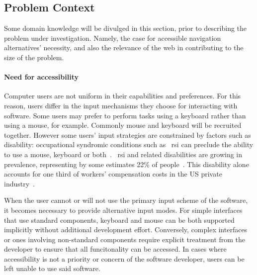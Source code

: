 \documentclass[11pt,openright,a4paper]{report}
\begin{document}
\subsection{Problem Context}
Some domain knowledge will be divulged in this section, prior to describing the problem under investigation. Namely, the case for accessible navigation alternatives' necessity, and also the relevance of the web in contributing to the size of the problem.
\paragraph{Need for accessibility}
Computer users are not uniform in their capabilities and preferences. For this reason, users differ in the input mechanisms they choose for interacting with software. Some users may prefer to perform tasks using a keyboard rather than using a mouse, for example. Commonly mouse and keyboard will be recruited together. However some users' input strategies are constrained by factors such as disability: occupational syndromic conditions such as ~\gls{rsi} can preclude the ability to use a mouse, keyboard or both~\cite{trewin1999keyboard}. ~\gls{rsi} and related disabilities are growing in prevalence, representing by some estimates 22\% of people~\cite{rsiprevalence}. This disability alone accounts for one third of workers' compensation costs in the US private industry~\cite{barr2002pathophysiological}.

When the user cannot or will not use the primary input scheme of the software, it becomes necessary to provide alternative input modes. For simple interfaces that use standard components, keyboard and mouse can be both supported implicitly without additional development effort. Conversely, complex interfaces or ones involving non-standard components require explicit treatment from the developer to ensure that all funcitonality can be accessed. In cases where accessibility is not a priority or concern of the software developer, users can be left unable to use said software.
\end{document}
